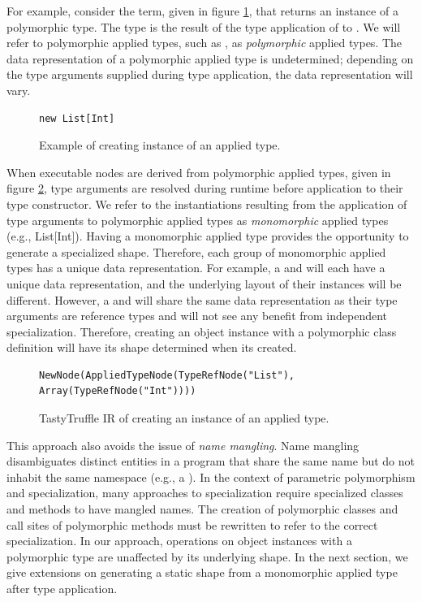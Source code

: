 For example, consider the term, given in figure \ref{example:applied-type}, that returns an instance of a polymorphic type.
The type  is the result of the type application of  to .
We will refer to polymorphic applied types, such as , as \textit{polymorphic} applied types. 
The data representation of a polymorphic applied type is undetermined; depending on the type arguments supplied during type application, the data representation will vary.

\begin{figure}[!htb]
\begin{verbatim}
new List[Int]
\end{verbatim}
\caption{Example of creating instance of an applied type.}
\label{example:applied-type}
\end{figure}

When executable nodes are derived from polymorphic applied types, given in figure \ref{example:applied-type-node}, type arguments are resolved during runtime before application to their type constructor.
We refer to the instantiations resulting from the application of type arguments to polymorphic applied types as \textit{monomorphic} applied types (e.g., List[Int]).
Having a monomorphic applied type provides the opportunity to generate a specialized shape.
Therefore, each group of monomorphic applied types has a unique data representation.
For example, a  and  will each have a unique data representation, and the underlying layout of their instances will be different.
However, a  and  will share the same data representation as their type arguments are reference types and will not see any benefit from independent specialization.
Therefore, creating an object instance with a polymorphic class definition will have its shape determined when its created.

\begin{figure}[!htb]
\begin{verbatim}
NewNode(AppliedTypeNode(TypeRefNode("List"), Array(TypeRefNode("Int"))))
\end{verbatim}
\caption{TastyTruffle IR of creating an instance of an applied type.}
\label{example:applied-type-node}
\end{figure}

This approach also avoids the issue of \textit{name mangling}.
Name mangling disambiguates distinct entities in a program that share the same name but do not inhabit the same namespace (e.g., a ).
In the context of parametric polymorphism and specialization, many approaches to specialization require specialized classes and methods to have mangled names.
The creation of polymorphic classes and call sites of polymorphic methods must be rewritten to refer to the correct specialization.
In our approach, operations on object instances with a polymorphic type are unaffected by its underlying shape.
In the next section, we give extensions on generating a static shape from a monomorphic applied type after type application.


